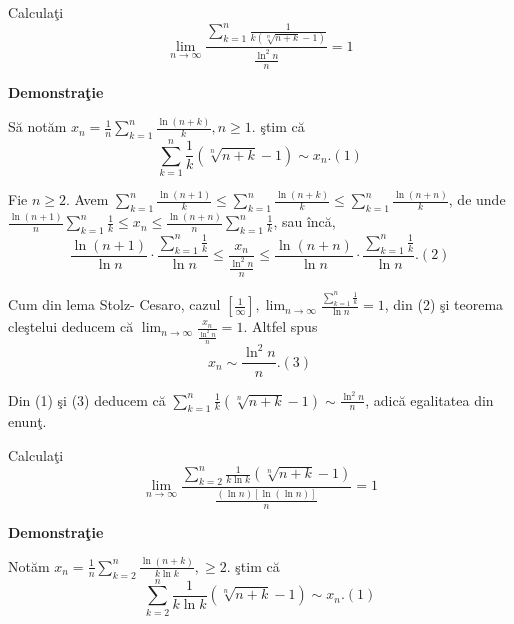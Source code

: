 \documentclass[a4paper,12pt,oneside]{report}
\begin{document}
Calcula\c ti 
\begin{displaymath}
  \lim_{n \to \infty }\frac{\sum_{k=1}^{n}\frac{1}{k\left ( \sqrt[n]{n+k}-1 \right )}}{\frac{\ln^{2}n}{n}} = 1
\end{displaymath}

\textbf{Demonstra\c tie} 

S\u a not\u am \(x_{n}= \frac{1}{n}\sum_{k=1}^{n}\frac{\ln\left ( n+k \right )}{k}, n\geq 1\). 
\c stim c\u a 
\begin{displaymath}
  \sum_{k=1}^{n}\frac{1}{k}\left ( \sqrt[n]{n+k}-1 \right )\sim x_{n}. (1)
\end{displaymath}

Fie \(n\geq 2\). Avem \(\sum_{k=1}^{n}\frac{\ln\left ( n+1 \right )}{k}\leq \sum_{k=1}^{n}\frac{\ln\left ( n+k \right )}{k}\leq \sum_{k=1}^{n}\frac{\ln\left ( n+n \right )}{k}\), de unde 
\(\frac{\ln \left ( n+1 \right )}{n}\sum_{k=1}^{n}\frac{1}{k}\leq x_{n}\leq \frac{\ln \left ( n+n \right )}{n}\sum_{k=1}^{n}\frac{1}{k}\), sau \^ inc\u a, 
\begin{displaymath}
  \frac{\ln \left ( n+1 \right )}{\ln n}\cdot \frac{\sum_{k=1}^{n}\frac{1}{k}}{\ln n}\leq \frac{x_{n}}{\frac{\ln^{2}n}{n}}\leq \frac{\ln \left ( n+n \right )}{\ln n}\cdot \frac{\sum_{k=1}^{n}\frac{1}{k}}{\ln n }. (2)
\end{displaymath}

Cum din lema Stolz- Cesaro, cazul \(\left [ \frac{1}{\infty } \right ], \lim_{n \to \infty }\frac{\sum_{k=1}^{n}\frac{1}{k}}{\ln n} = 1\), din (2) \c si teorema cle\c stelui deducem c\u a \(\lim_{n \to \infty }\frac{x_{n}}{\frac{\ln ^{2}n}{n}} = 1\). 
Altfel spus 
\begin{displaymath}
  x_{n}\sim \frac{\ln^{2}n}{n}. (3)
\end{displaymath}


Din (1) \c si (3) deducem c\u a \(\sum_{k=1}^{n}\frac{1}{k}\left ( \sqrt[n]{n+k}-1 \right )\sim \frac{\ln^{2}n}{n}\), adic\u a egalitatea din enun\c t. 

Calcula\c ti 
\begin{displaymath}
  \lim_{n \to \infty }\frac{\sum_{k=2}^{n}\frac{1}{k \ln k}\left ( \sqrt[n]{n+k}-1 \right )}{\frac{\left ( \ln n \right )\left [ \ln \left ( \ln n  \right ) \right ]}{n}} = 1
\end{displaymath}


\textbf{Demonstra\c tie}
 
Not\u am \(x_{n} = \frac{1}{n}\sum_{k=2}^{n}\frac{\ln \left ( n+k \right )}{k \ln k}, \geq 2.\)
\c stim c\u a 
\begin{displaymath}
  \sum_{k=2}^{n}\frac{1}{k\ln k}\left ( \sqrt[n]{n+k}-1 \right )\sim x_{n} . (1)
\end{displaymath}
\end{document}
